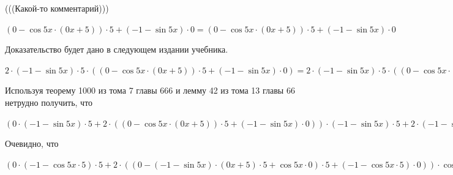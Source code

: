 \documentclass[12pt,a4paper,fleqn]{article}
\theoremstyle{definition}
\begin{document}
(((Какой-то комментарий))) 

$( 0  - \cos 5  x  \cdot ( 0  x  +  5 )) \cdot  5  + ( -1  - \sin 5  x ) \cdot  0  = ( 0  - \cos 5  x  \cdot ( 0  x  +  5 )) \cdot  5  + ( -1  - \sin 5  x ) \cdot  0 $

Доказательство будет дано в следующем издании учебника. 

$ 2  \cdot ( -1  - \sin 5  x ) \cdot  5  \cdot (( 0  - \cos 5  x  \cdot ( 0  x  +  5 )) \cdot  5  + ( -1  - \sin 5  x ) \cdot  0 ) =  2  \cdot ( -1  - \sin 5  x ) \cdot  5  \cdot (( 0  - \cos 5  x  \cdot ( 0  x  +  5 )) \cdot  5  + ( -1  - \sin 5  x ) \cdot  0 )$

Используя теорему 1000 из тома 7 главы 666 и лемму 42 из тома 13 главы 66 нетрудно получить, что 

$( 0  \cdot ( -1  - \sin 5  x ) \cdot  5  +  2  \cdot (( 0  - \cos 5  x  \cdot ( 0  x  +  5 )) \cdot  5  + ( -1  - \sin 5  x ) \cdot  0 )) \cdot ( -1  - \sin 5  x ) \cdot  5  +  2  \cdot ( -1  - \sin 5  x ) \cdot  5  \cdot (( 0  - \cos 5  x  \cdot ( 0  x  +  5 )) \cdot  5  + ( -1  - \sin 5  x ) \cdot  0 ) = ( 0  \cdot ( -1  - \sin 5  x ) \cdot  5  +  2  \cdot (( 0  - \cos 5  x  \cdot ( 0  x  +  5 )) \cdot  5  + ( -1  - \sin 5  x ) \cdot  0 )) \cdot ( -1  - \sin 5  x ) \cdot  5  +  2  \cdot ( -1  - \sin 5  x ) \cdot  5  \cdot (( 0  - \cos 5  x  \cdot ( 0  x  +  5 )) \cdot  5  + ( -1  - \sin 5  x ) \cdot  0 )$

Очевидно, что 

$( 0  \cdot ( -1  - \cos 5  x  \cdot  5 ) \cdot  5  +  2  \cdot (( 0  - ( -1  - \sin 5  x ) \cdot ( 0  x  +  5 ) \cdot  5  + \cos 5  x  \cdot  0 ) \cdot  5  + ( -1  - \cos 5  x  \cdot  5 ) \cdot  0 )) \cdot \cos 5  x  +  2  \cdot ( -1  - \cos 5  x  \cdot  5 ) \cdot  5  \cdot ( -1  - \sin 5  x ) \cdot ( 0  x  +  5 ) + ( 0  \cdot ( -1  - \sin 5  x ) \cdot  5  +  2  \cdot (( 0  - \cos 5  x  \cdot ( 0  x  +  5 )) \cdot  5  + ( -1  - \sin 5  x ) \cdot  0 )) \cdot ( -1  - \sin 5  x ) \cdot  5  +  2  \cdot ( -1  - \sin 5  x ) \cdot  5  \cdot (( 0  - \cos 5  x  \cdot ( 0  x  +  5 )) \cdot  5  + ( -1  - \sin 5  x ) \cdot  0 ) = ( 0  \cdot ( -1  - \cos 5  x  \cdot  5 ) \cdot  5  +  2  \cdot (( 0  - ( -1  - \sin 5  x ) \cdot ( 0  x  +  5 ) \cdot  5  + \cos 5  x  \cdot  0 ) \cdot  5  + ( -1  - \cos 5  x  \cdot  5 ) \cdot  0 )) \cdot \cos 5  x  +  2  \cdot ( -1  - \cos 5  x  \cdot  5 ) \cdot  5  \cdot ( -1  - \sin 5  x ) \cdot ( 0  x  +  5 ) + ( 0  \cdot ( -1  - \sin 5  x ) \cdot  5  +  2  \cdot (( 0  - \cos 5  x  \cdot ( 0  x  +  5 )) \cdot  5  + ( -1  - \sin 5  x ) \cdot  0 )) \cdot ( -1  - \sin 5  x ) \cdot  5  +  2  \cdot ( -1  - \sin 5  x ) \cdot  5  \cdot (( 0  - \cos 5  x  \cdot ( 0  x  +  5 )) \cdot  5  + ( -1  - \sin 5  x ) \cdot  0 )$
\end{document}
